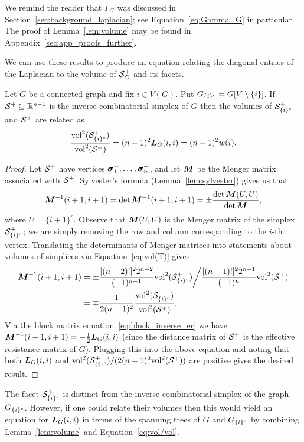 We remind the reader that $\Gamma_G$ was discussed in  Section~\ref{sec:background_laplacian}; see  Equation~\eqref{eq:Gamma_G}  in particular. The proof of Lemma~\ref{lem:volume} may  be  found in Appendix~\ref{sec:app_proofs_further}.   


We can use these results to produce an  equation relating the  diagonal entries of the Laplacian to the volume of $\mathcal{S}_G^+$ and its facets.  

\begin{lemma}
	\label{lem:L(i,i)_trees}
	Let $G$ be a connected graph and fix $i\in V(G)$. 
	Put $G_{\{i\}^c}=G[V\setminus \{i\}]$. If $\mathcal{S}^+\subseteq\mathbb{R}^{n-1}$  is the inverse combinatorial simplex of $G$ then the volumes
	of $\mathcal{S}^+_{\{i\}^c}$ and $\mathcal{S}^+$ are related as 
	\begin{equation}
	\label{eq:vol/vol}
	\frac{\textnormal{vol}^2(\mathcal{S}_{\{i\}^c}^+)}{\textnormal{vol}^2(\mathcal{S}^+)} = (n-1)^2\vb*{L}_G(i,i) = (n-1)^2w(i).
	\end{equation}
\end{lemma}
\begin{proof}
	Let $\mathcal{S}^+$ have vertices $\vb*{\sigma}_1^+,\dots,\vb*{\sigma}_n^+$, and let ${\vb*{M}}$ be the Menger matrix associated with $\mathcal{S}^+$. Sylvester's formula (Lemma~\ref{lem:sylvester}) gives us that 
	\begin{equation*}
	\M^{-1}(i+1,i+1) =\det\M^{-1}(i+1,i+1)= \pm \frac{\det\M(U,U)}{\det\M},
	\end{equation*}
	where $U=\{i+1\}^c$. Observe that ${\vb*{M}}(U,U)$ is the Menger matrix of the simplex $\mathcal{S}_{\{i\}^c}^+$; we are simply removing the row and column corresponding to the $i$-th vertex. Translating the determinants of Menger matrices into statements about volumes of simplices via Equation~\eqref{eq:vol(T)} gives 
	\begin{align*}
	{\vb*{M}}^{-1}(i+1,i+1) &= \pm \frac{[(n-2)!]^2 2^{n-2}}{(-1)^{n-1}}\textnormal{vol}^2(\mathcal{S}_{\{i\}^c}^+) \bigg / \frac{[(n-1)!]^2 2^{n-1}}{(-1)^n} \textnormal{vol}^2(\mathcal{S}^+) \\
	&= \mp \frac{1}{2(n-1)^2}\frac{\textnormal{vol}^2(\mathcal{S}_{\{i\}^c}^+)}{\textnormal{vol}^2(\mathcal{S}^+)}. 
	\end{align*} 
	Via the block matrix equation~\eqref{eq:block_inverse_er} we have ${\vb*{M}}^{-1}(i+1,i+1) = -\frac{1}{2}\vb*{L}_G(i,i)$ (since the distance matrix  of $\mathcal{S}^+$  is the effective resistance matrix of $G$). Plugging this into the above equation and noting that both $\vb*{L}_G(i,i)$ and $\textnormal{vol}^2(\mathcal{S}_{\{i\}^c}^+)/(2(n-1)^2\textnormal{vol}^2(\mathcal{S}^+))$ are positive  gives the desired result. 
\end{proof}

\begin{remark}
	The facet  $\mathcal{S}_{\{i\}^c}^+$ is distinct from the inverse combinatorial  simplex of the graph  $G_{\{i\}^c}$. However, if one could relate  their volumes then this would yield an equation for  $\vb*{L}_G(i,i)$ in terms of the spanning trees of $G$ and  $G_{\{i\}^c}$ by combining Lemma~\ref{lem:volume}  and Equation~\eqref{eq:vol/vol}.  
\end{remark}

